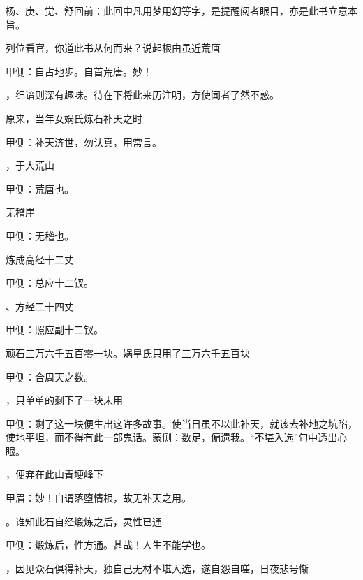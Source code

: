 \begin{parag}
    \begin{note}杨、庚、觉、舒回前：此回中凡用梦用幻等字，是提醒阅者眼目，亦是此书立意本旨。\end{note}

\end{parag}


\begin{parag}
    列位看官，你道此书从何而来？说起根由虽近荒唐
    \begin{note}甲侧：自占地步。自首荒唐。妙！\end{note}，细谙则深有趣味。待在下将此来历注明，方使闻者了然不惑。

\end{parag}


\begin{parag}
    原来，当年女娲氏炼石补天之时\begin{note}甲侧：补天济世，勿认真，用常言。\end{note}，于大荒山\begin{note}甲侧：荒唐也。\end{note}无稽崖\begin{note}甲侧：无稽也。\end{note}炼成高经十二丈\begin{note}甲侧：总应十二钗。\end{note}、方经二十四丈\begin{note}甲侧：照应副十二钗。\end{note}顽石三万六千五百零一块。娲皇氏只用了三万六千五百块\begin{note}甲侧：合周天之数。\end{note}，只单单的剩下了一块未用\begin{note}甲侧：剩了这一块便生出这许多故事。使当日虽不以此补天，就该去补地之坑陷，使地平坦，而不得有此一部鬼话。蒙侧：数足，偏遗我。“不堪入选”句中透出心眼。\end{note}，便弃在此山青埂峰下\begin{note}甲眉：妙！自谓落堕情根，故无补天之用。\end{note}。谁知此石自经煅炼之后，灵性已通\begin{note}甲侧：煅炼后，性方通。甚哉！人生不能学也。\end{note}，因见众石俱得补天，独自己无材不堪入选，遂自怨自嗟，日夜悲号惭

\end{parag}


